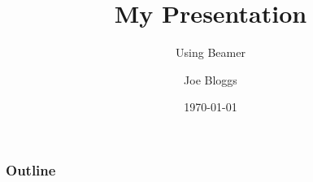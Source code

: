 \documentclass{beamer}
\title{My Presentation}
\subtitle{Using Beamer}
\author{Joe Bloggs}
\institute{University of ShareLaTeX}
\date{\today}
\begin{document}
 

\begin{frame} 
\titlepage 
\transsplitverticalout
\end{frame}

\begin{frame} 
\frametitle{Outline} 
\tableofcontents 
\end{frame}

\begin{frame} 
 
\end{frame}
\end{document}
